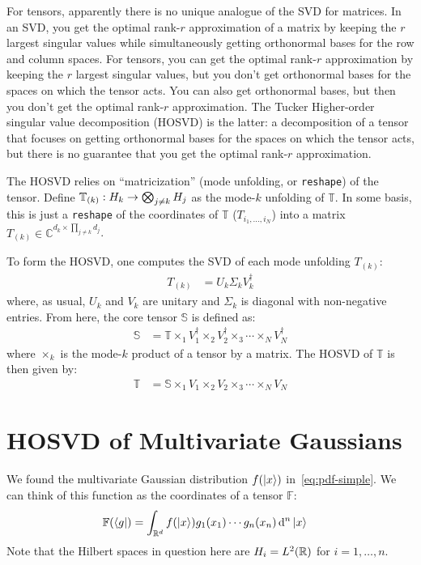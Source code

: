\documentclass[12pt]{article}
\numberwithin{theorem}{section}
\numberwithin{equation}{section}
\numberwithin{figure}{section}
\begin{document}
For tensors, apparently there is no unique analogue of the SVD for matrices. In
an SVD, you get the optimal rank-\(r\) approximation of a matrix by keeping the
\(r\) largest singular values while simultaneously getting orthonormal bases for
the row and column spaces. For tensors, you can get the optimal rank-\(r\)
approximation by keeping the \(r\) largest singular values, but you don't get
orthonormal bases for the spaces on which the tensor acts. You can also get
orthonormal bases, but then you don't get the optimal rank-\(r\) approximation.
The Tucker Higher-order singular value decomposition (HOSVD) is the latter: a
decomposition of a tensor that focuses on getting orthonormal bases for the
spaces on which the tensor acts, but there is no guarantee that you get the
optimal rank-\(r\) approximation.

The HOSVD relies on ``matricization'' (mode unfolding, or \texttt{reshape}) of
the tensor. Define \(\mathbb{T}_{\qty(k)} : H_k \to \bigotimes_{j\neq k} H_j\)
as the mode-\(k\) unfolding of \(\mathbb{T}\). In some basis, this is just a
\texttt{reshape} of the coordinates of \(\mathbb{T}\) (\(T_{i_1, \ldots, i_N}\))
into a matrix \(T_{(k)} \in \mathbb{C}^{d_k \times \prod_{j\neq k} d_j}\).

To form the HOSVD, one computes the SVD of each mode unfolding \(T_{(k)}\):
\begin{align*}
    T_{(k)} &= U_k \Sigma_k V_k^\dagger
\end{align*}
where, as usual, \(U_k\) and \(V_k\) are unitary and \(\Sigma_k\) is diagonal
with non-negative entries. From here, the core tensor \(\mathbb{S}\) is defined
as:
\begin{align*}
    \mathbb{S} &= \mathbb{T} \times_1 V_1^\dagger \times_2 V_2^\dagger \times_3 \cdots \times_N V_N^\dagger
\end{align*}
where \(\times_k\) is the mode-\(k\) product of a tensor by a matrix. The HOSVD
of \(\mathbb{T}\) is then given by:
\begin{align*}
    \mathbb{T} &= \mathbb{S} \times_1 V_1 \times_2 V_2 \times_3 \cdots \times_N V_N
\end{align*}

\section{HOSVD of Multivariate Gaussians}
We found the multivariate Gaussian distribution \(f\qty(\ket{x})\)
in~\cref{eq:pdf-simple}. We can think of this function as the coordinates of a
tensor \(\mathbb{F}\):
\begin{align*}
    \mathbb{F}\qty(\bra{g}) &= \int_{\mathbb{R}^d} f\qty(\ket{x}) g_1\qty(x_1) \cdots g_n\qty(x_n) \dd[n]{\ket{x}}
\end{align*}
Note that the Hilbert spaces in question here are \(H_i = L^2\qty(\mathbb{R})\)
for \(i = 1, \ldots, n\).
\end{document}
